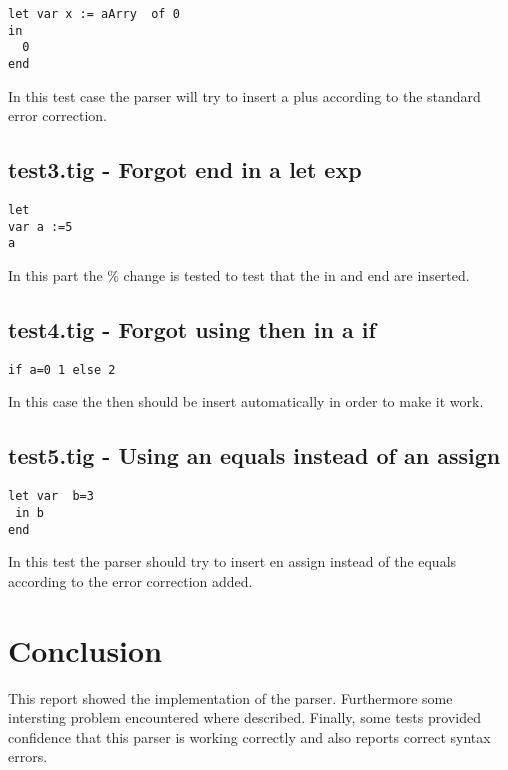 \documentclass{article}
\begin{document}

\begin{lstlisting}[frame=single]
let var x := aArry  of 0
in
  0
end
\end{lstlisting}

In this test case the parser will try to insert a plus according to the standard error correction.

\subsection{test3.tig - Forgot end in a let exp}
\begin{lstlisting}[frame=single]
let
var a :=5
a
\end{lstlisting}

In this part the \% change is tested to test that the in and end are inserted.

\subsection{test4.tig - Forgot using then in a if}
\begin{lstlisting}[frame=single]
if a=0 1 else 2
\end{lstlisting}

In this case the then should be insert automatically in order to make it work.

\subsection{test5.tig - Using an equals instead of an assign}
\begin{lstlisting}[frame=single]
let var  b=3
 in b
end
\end{lstlisting}

In this test the parser should try to insert en assign instead of the equals according to the error correction added. 

\section{Conclusion}
This report showed the implementation of the parser. Furthermore some intersting problem encountered where described. Finally, some tests provided confidence that this parser is working correctly and also reports correct syntax errors.
\end{document}
